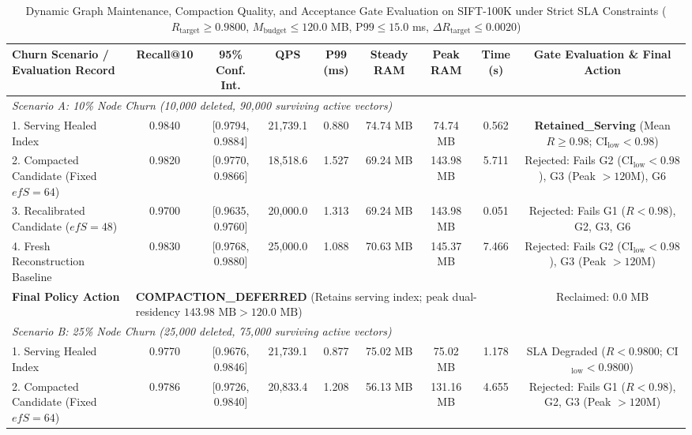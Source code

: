 \begin{table}[t]
\centering
\caption{Dynamic Graph Maintenance, Compaction Quality, and Acceptance Gate Evaluation on SIFT-100K under Strict SLA Constraints ($R_{\text{target}} \ge 0.9800$, $M_{\text{budget}} \le 120.0$ MB, $\text{P99} \le 15.0$ ms, $\Delta R_{\text{target}} \le 0.0020$)}
\label{tab:dynamic_maintenance}
\scriptsize
\begin{tabular}{lcccccccc}
\toprule
\textbf{Churn Scenario / Evaluation Record} & \textbf{Recall@10} & \textbf{95\% Conf. Int.} & \textbf{QPS} & \textbf{P99 (ms)} & \textbf{Steady RAM} & \textbf{Peak RAM} & \textbf{Time (s)} & \textbf{Gate Evaluation \& Final Action} \\
\midrule
\multicolumn{9}{l}{\textit{Scenario A: 10\% Node Churn (10,000 deleted, 90,000 surviving active vectors)}} \\
\midrule
1. Serving Healed Index & 0.9840 & [0.9794, 0.9884] & 21,739.1 & 0.880 & 74.74 MB & 74.74 MB & 0.562 & \textbf{Retained\_Serving} (Mean $R \ge 0.98$; CI$_{\text{low}} < 0.98$) \\
2. Compacted Candidate (Fixed $efS=64$) & 0.9820 & [0.9770, 0.9866] & 18,518.6 & 1.527 & 69.24 MB & 143.98 MB & 5.711 & Rejected: Fails G2 (CI$_{\text{low}} < 0.98$), G3 (Peak $> 120$M), G6 \\
3. Recalibrated Candidate ($efS=48$) & 0.9700 & [0.9635, 0.9760] & 20,000.0 & 1.313 & 69.24 MB & 143.98 MB & 0.051 & Rejected: Fails G1 ($R < 0.98$), G2, G3, G6 \\
4. Fresh Reconstruction Baseline & 0.9830 & [0.9768, 0.9880] & 25,000.0 & 1.088 & 70.63 MB & 145.37 MB & 7.466 & Rejected: Fails G2 (CI$_{\text{low}} < 0.98$), G3 (Peak $> 120$M) \\
\rowcolor{blue!5}
\textbf{Final Policy Action} & \multicolumn{7}{l}{\textbf{COMPACTION\_DEFERRED} (Retains serving index; peak dual-residency $143.98\text{ MB} > 120.0\text{ MB}$)} & Reclaimed: 0.0 MB \\
\midrule
\multicolumn{9}{l}{\textit{Scenario B: 25\% Node Churn (25,000 deleted, 75,000 surviving active vectors)}} \\
\midrule
1. Serving Healed Index & 0.9770 & [0.9676, 0.9846] & 21,739.1 & 0.877 & 75.02 MB & 75.02 MB & 1.178 & SLA Degraded ($R < 0.9800$; CI$_{\text{low}} < 0.9800$) \\
2. Compacted Candidate (Fixed $efS=64$) & 0.9786 & [0.9726, 0.9840] & 20,833.4 & 1.208 & 56.13 MB & 131.16 MB & 4.655 & Rejected: Fails G1 ($R < 0.98$), G2, G3 (Peak $> 120$M) \\

\end{tabular}
\end{table}
